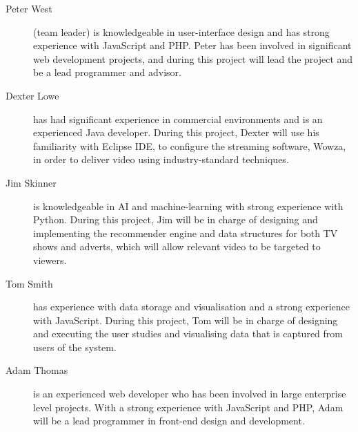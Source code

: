 \begin{description}

\item[Peter West] (team leader) is knowledgeable in user-interface design and has strong experience with JavaScript and PHP. Peter has been involved in significant web development projects, and during this project will lead the project and be a lead programmer and advisor.

\item[Dexter Lowe] has had significant experience in commercial environments and is an experienced Java developer. During this project, Dexter will use his familiarity with Eclipse IDE, to configure the streaming software, Wowza, in order to deliver video using industry-standard techniques.

\item[Jim Skinner] is knowledgeable in AI and machine-learning with strong experience with Python. During this project, Jim will be in charge of designing and implementing the recommender engine and data structures for both TV shows and adverts, which will allow relevant video to be targeted to viewers.

\item[Tom Smith] has experience with data storage and visualisation and a strong experience with JavaScript. During this project, Tom will be in charge of designing and executing the user studies and visualising data that is captured from users of the system.

\item[Adam Thomas] is an experienced web developer who has been involved in large enterprise level projects. With a strong experience with JavaScript and PHP, Adam will be a lead programmer in front-end design and development. 

\end{description}